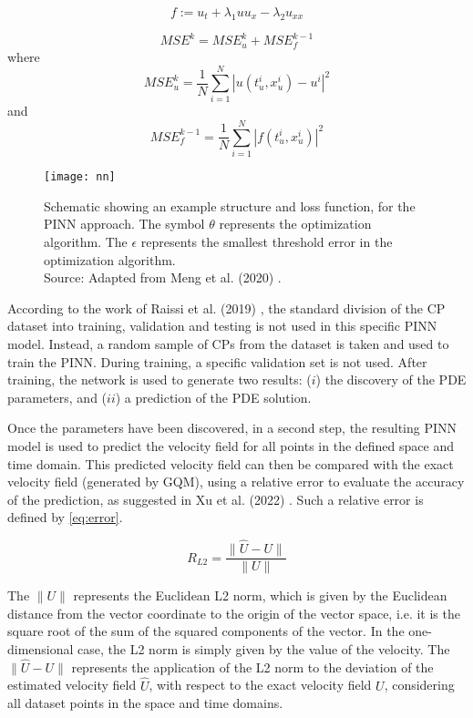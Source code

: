 \documentclass[conference]{IEEEtran}
\begin{document}
\begin{equation}
f := u_t + \lambda_1 u u_x - \lambda_2 u_{xx}
\label{eq:ftx}
\end{equation}

\begin{minipage}[htb]{.95\columnwidth}\bigskip\begin{equation}
MSE^k = MSE_u^k + MSE_f^{k-1}
\label{eq:mse}\end{equation}
where
$$ MSE_u^k = \frac{1}{N}\sum_{i=1}^{N}|u(t^i_u, x^i_u)-u^i|^2 $$
and
$$ MSE_f^{k-1} = \frac{1}{N}\sum_{i=1}^{N}|f(t^i_u, x^i_u)|^2 $$
\bigskip\end{minipage}%

\begin{figure}[htb]\centering
\texttt{[image: nn]}
\caption{Schematic showing an example structure and loss function, for the PINN approach. The symbol $\theta$ represents the optimization algorithm. The $\epsilon$ represents the smallest threshold error in the optimization algorithm.\\
Source: Adapted from Meng et al. (2020) \cite{Meng2020}.}
\label{fig:nn}
\end{figure}

According to the work of Raissi et al. (2019) \cite{Raissi2019}, the standard division of the CP dataset into training, validation and testing is not used in this specific PINN model. Instead, a random sample of CPs from the dataset is taken and used to train the PINN. During training, a specific validation set is not used. After training, the network is used to generate two results: ($i$) the discovery of the PDE parameters, and ($ii$) a prediction of the PDE solution.

Once the parameters have been discovered, in a second step, the resulting PINN model is used to predict the velocity field for all points in the defined space and time domain. This predicted velocity field can then be compared with the exact velocity field (generated by GQM), using a relative error to evaluate the accuracy of the prediction, as suggested in Xu et al. (2022) \cite{Xu2022}. Such a relative error is defined by \autoref{eq:error}.

\begin{equation}
R_{L2} = \frac{\| \widehat{U} - U \|}{\|U\|}
\label{eq:error}
\end{equation}

The $\|U\|$ represents the Euclidean L2 norm, which is given by the Euclidean distance from the vector coordinate to the origin of the vector space, i.e. it is the square root of the sum of the squared components of the vector. In the one-dimensional case, the L2 norm is simply given by the value of the velocity.
The $\| \widehat{U} - {U} \| $ represents the application of the L2 norm to the deviation of the estimated velocity field $\widehat{U}$, with respect to the exact velocity field $U$, considering all dataset points in the space and time domains.
\end{document}
